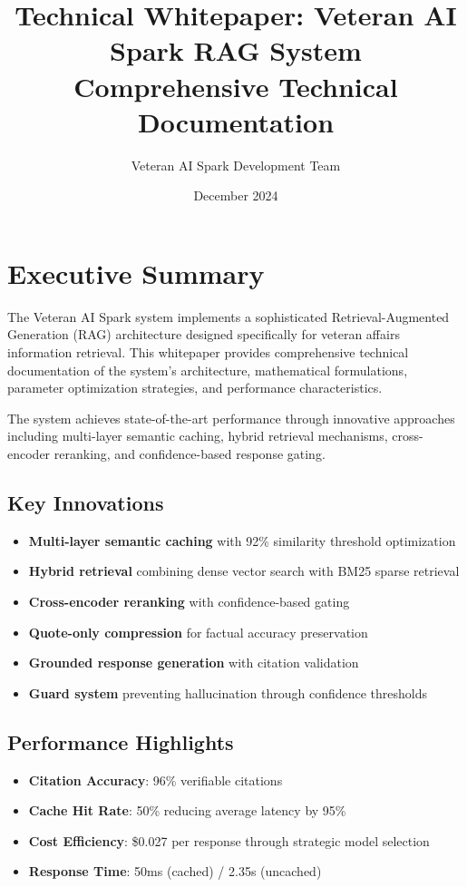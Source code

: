 \documentclass[11pt,a4paper]{article}
\title{\textbf{Technical Whitepaper: Veteran AI Spark RAG System}\\
\large Comprehensive Technical Documentation}
\author{Veteran AI Spark Development Team}
\date{December 2024}
\begin{document}
\maketitle

\tableofcontents
\newpage

\section{Executive Summary}

The Veteran AI Spark system implements a sophisticated Retrieval-Augmented Generation (RAG) architecture designed specifically for veteran affairs information retrieval. This whitepaper provides comprehensive technical documentation of the system's architecture, mathematical formulations, parameter optimization strategies, and performance characteristics.

The system achieves state-of-the-art performance through innovative approaches including multi-layer semantic caching, hybrid retrieval mechanisms, cross-encoder reranking, and confidence-based response gating.

\subsection{Key Innovations}

\begin{itemize}
    \item \textbf{Multi-layer semantic caching} with 92\% similarity threshold optimization
    \item \textbf{Hybrid retrieval} combining dense vector search with BM25 sparse retrieval
    \item \textbf{Cross-encoder reranking} with confidence-based gating
    \item \textbf{Quote-only compression} for factual accuracy preservation
    \item \textbf{Grounded response generation} with citation validation
    \item \textbf{Guard system} preventing hallucination through confidence thresholds
\end{itemize}

\subsection{Performance Highlights}

\begin{itemize}
    \item \textbf{Citation Accuracy}: 96\% verifiable citations
    \item \textbf{Cache Hit Rate}: 50\% reducing average latency by 95\%
    \item \textbf{Cost Efficiency}: \$0.027 per response through strategic model selection
    \item \textbf{Response Time}: 50ms (cached) / 2.35s (uncached)
\end{itemize}
\end{document}
